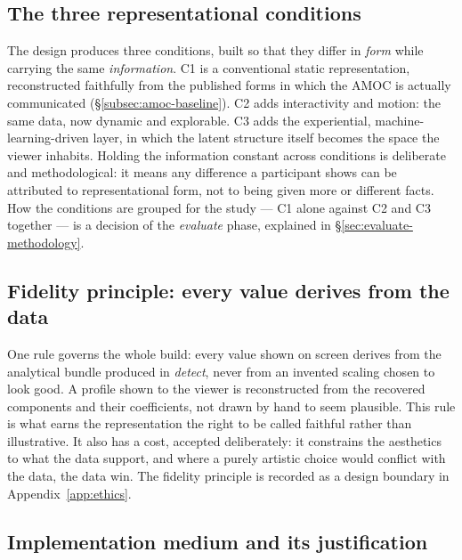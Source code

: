 \subsection{The three representational conditions}
\label{subsec:translate-conditions}
 
The design produces three conditions, built so that they differ in \emph{form} while carrying the same \emph{information}. C1 is a conventional static representation, reconstructed faithfully from the published forms in which the AMOC is actually communicated (\S\ref{subsec:amoc-baseline}). C2 adds interactivity and motion: the same data, now dynamic and explorable. C3 adds the experiential, machine-learning-driven layer, in which the latent structure itself becomes the space the viewer inhabits. Holding the information constant across conditions is deliberate and methodological: it means any difference a participant shows can be attributed to representational form, not to being given more or different facts. How the conditions are grouped for the study --- C1 alone against C2 and C3 together --- is a decision of the \emph{evaluate} phase, explained in \S\ref{sec:evaluate-methodology}.
 
\subsection{Fidelity principle: every value derives from the data}
\label{subsec:translate-fidelity}
 
One rule governs the whole build: every value shown on screen derives from the analytical bundle produced in \emph{detect}, never from an invented scaling chosen to look good. A profile shown to the viewer is reconstructed from the recovered components and their coefficients, not drawn by hand to seem plausible. This rule is what earns the representation the right to be called faithful rather than illustrative. It also has a cost, accepted deliberately: it constrains the aesthetics to what the data support, and where a purely artistic choice would conflict with the data, the data win. The fidelity principle is recorded as a design boundary in Appendix~\ref{app:ethics}.
 
\subsection{Implementation medium and its justification}
\label{subsec:translate-stack}
 
